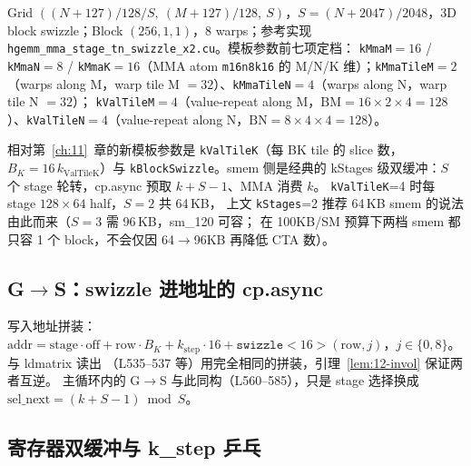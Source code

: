 Grid $((N{+}127)/128/S,\ (M{+}127)/128,\ S)$，$S=(N{+}2047)/2048$，3D block
swizzle；Block $(256,1,1)$，8 warps；参考实现
\texttt{hgemm\_mma\_stage\_tn\_swizzle\_x2.cu}。模板参数前七项定档：
\texttt{kMmaM}$=16$ / \texttt{kMmaN}$=8$ / \texttt{kMmaK}$=16$（MMA atom
\texttt{m16n8k16} 的 M/N/K 维）；\texttt{kMmaTileM}$=2$（warps along M，warp
tile M $= 32$）、\texttt{kMmaTileN}$=4$（warps along N，warp tile N $= 32$）；
\texttt{kValTileM}$=4$（value-repeat along M，$\mathrm{BM} = 16\times2\times4 =
128$）、\texttt{kValTileN}$=4$（value-repeat along N，$\mathrm{BN} = 8\times4\times4
= 128$）。



相对第~\ref{ch:11}~章的新模板参数是 \texttt{kValTileK}（每 BK tile 的 slice 数，
$B_K=16\,k_{\mathrm{ValTileK}}$）与 \texttt{k\allowbreak{}Block\allowbreak{}Swizzle}。smem 侧是经典的
kStages 级双缓冲：$S$ 个 stage 轮转，cp.async 预取 $k{+}S{-}1$、MMA 消费 $k$。
\texttt{kValTileK}{=}4 时每 stage $128{\times}64$ half，$S{=}2$ 共 64\,KB，
上文 \texttt{kStages}{=}2 推荐 64\,KB smem 的说法由此而来（$S{=}3$ 需 96\,KB，sm\_120 可容；
在 100KB/SM 预算下两档 smem 都只容 1 个 block，不会仅因 64$\to$96KB 再降低 CTA 数）。

\subsection{G$\to$S：swizzle 进地址的 cp.async}



写入地址拼装：$\mathrm{addr} = \mathrm{stage}\cdot\mathrm{off} +
\mathrm{row}\cdot B_K + k_{\mathrm{step}}\cdot16 +
\texttt{swizzle}<16>(\mathrm{row}, j)$，$j\in\{0,8\}$。与 ldmatrix 读出
（L535--537 等）用完全相同的拼装，引理~\ref{lem:12-invol} 保证两者互逆。
主循环内的 G$\to$S 与此同构（L560--585），只是 stage 选择换成
$\mathrm{sel\_next}=(k{+}S{-}1)\bmod S$。

\subsection{寄存器双缓冲与 k\_step 乒乓}




